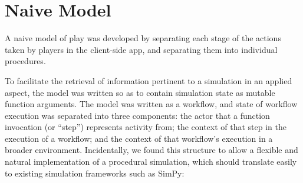 \section{Naive Model}\label{sec:optimisation_with_aspects_naivemodel}

A naive model of play was developed by separating each stage of the actions
taken by players in the client-side app, and separating them into individual
procedures. 

To facilitate the retrieval of information pertinent to a simulation in an
applied aspect, the model was written so as to contain simulation state as
mutable function arguments. The model was written as a workflow, and state of
workflow execution was separated into three components: the actor that a
function invocation (or ``step'') represents activity from; the context of that
step in the execution of a workflow; and the context of that workflow's
execution in a broader environment. Incidentally, we found this structure to
allow a flexible and natural implementation of a procedural simulation, which
should translate easily to existing simulation frameworks such as
SimPy\cite{simpy_intro}:

